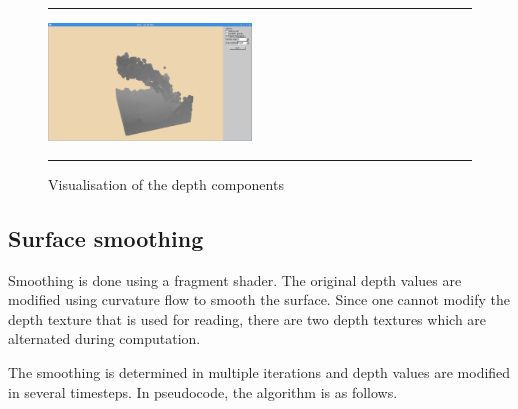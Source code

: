 \begin{figure}[!th]
\hrule
\begin{center}
\vspace*{2ex}\includegraphics[width=0.48\textwidth,clip=true,trim=10cm 1cm 10cm 3cm]{pictures/depth_normal.png}
\end{center}
\caption{Visualisation of the depth components}
\label{fig:depth} 
\vspace*{2ex}
\hrule
\end{figure}



\subsection{Surface smoothing}
Smoothing is done using a fragment shader.
The original depth values are modified using curvature flow to smooth the surface.
Since one cannot modify the depth texture that is used for reading, there are two depth textures which are alternated during computation.

The smoothing is determined in multiple iterations and depth values are modified in several timesteps.
In pseudocode, the algorithm is as follows.


